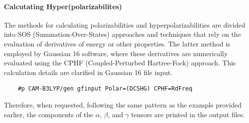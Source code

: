 \documentclass{article}
\begin{document}
	\paragraph{Calcutating Hyper(polarizabilites)}	
	\qquad The methods for calculating polarizabilities and hyperpolarizabilities are divided into SOS (Summation-Over-States) approaches and techniques that rely on the evaluation of derivatives of energy or other properties. The latter method is employed by Gaussian 16 software, where these derivatives are numerically evaluated using the CPHF (Coupled-Perturbed Hartree-Fock) approach. This calculation details are clarified in Gaussian 16 file input.\\
 	\begin{verbatim}
 	#p CAM-B3LYP/gen gfinput Polar=(DCSHG) CPHF=RdFreq 
 	\end{verbatim}
	\qquad Therefore, when requested, following the same pattern as the example provided earlier, the components of the $\alpha$, $\beta$, and $\gamma$ tensors are printed in the output files. \\
	
\end{document}
